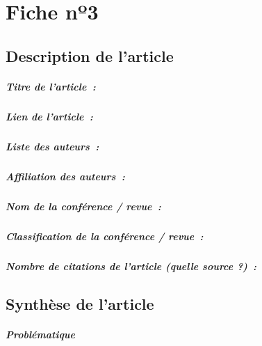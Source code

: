 
\chapter{Fiche nº3} %
\label{app:Fiche3} %

\section{Description de l'article}

\paragraph{Titre de l'article~:}
\paragraph{Lien de l'article~:}
\paragraph{Liste des auteurs~:}
\paragraph{Affiliation des auteurs~:}
\paragraph{Nom de la conférence / revue~:}
\paragraph{Classification de la conférence / revue~:}
\paragraph{Nombre de citations de l'article (quelle source ?)~:}



\section{Synthèse de l'article}

\paragraph{Problématique}

